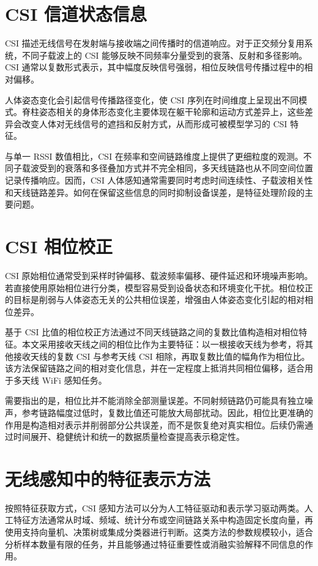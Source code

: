 \section{CSI 信道状态信息}
CSI 描述无线信号在发射端与接收端之间传播时的信道响应。对于正交频分复用系统，不同子载波上的 CSI 能够反映不同频率分量受到的衰落、反射和多径影响。CSI 通常以复数形式表示，其中幅度反映信号强弱，相位反映信号传播过程中的相对偏移。

人体姿态变化会引起信号传播路径变化，使 CSI 序列在时间维度上呈现出不同模式。脊柱姿态相关的身体形态变化主要体现在躯干轮廓和运动方式差异上，这些差异会改变人体对无线信号的遮挡和反射方式，从而形成可被模型学习的 CSI 特征。

与单一 RSSI 数值相比，CSI 在频率和空间链路维度上提供了更细粒度的观测。不同子载波受到的衰落和多径叠加方式并不完全相同，多天线链路也从不同空间位置记录传播响应。因而，CSI 人体感知通常需要同时考虑时间连续性、子载波相关性和天线链路差异。如何在保留这些信息的同时抑制设备误差，是特征处理阶段的主要问题。

\section{CSI 相位校正}
CSI 原始相位通常受到采样时钟偏移、载波频率偏移、硬件延迟和环境噪声影响。若直接使用原始相位进行分类，模型容易受到设备状态和环境变化干扰。相位校正的目标是削弱与人体姿态无关的公共相位误差，增强由人体姿态变化引起的相对相位差异。

基于 CSI 比值的相位校正方法通过不同天线链路之间的复数比值构造相对相位特征。本文采用接收天线之间的相位比作为主要特征：以一根接收天线为参考，将其他接收天线的复数 CSI 与参考天线 CSI 相除，再取复数比值的幅角作为相位比。该方法保留链路之间的相对变化信息，并在一定程度上抵消共同相位偏移，适合用于多天线 WiFi 感知任务。

需要指出的是，相位比并不能消除全部测量误差。不同射频链路仍可能具有独立噪声，参考链路幅度过低时，复数比值还可能放大局部扰动。因此，相位比更准确的作用是构造相对表示并削弱部分公共误差，而不是恢复绝对真实相位。后续仍需通过时间展开、稳健统计和统一的数据质量检查提高表示稳定性。

\section{无线感知中的特征表示方法}
按照特征获取方式，CSI 感知方法可以分为人工特征驱动和表示学习驱动两类。人工特征方法通常从时域、频域、统计分布或空间链路关系中构造固定长度向量，再使用支持向量机、决策树或集成分类器进行判断。这类方法的参数规模较小，适合分析样本数量有限的任务，并且能够通过特征重要性或消融实验解释不同信息的作用。

